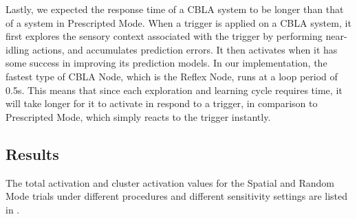 Lastly, we expected the response time of a CBLA system to be longer than that of a system in Prescripted Mode. When a trigger is applied on a CBLA system, it first explores the sensory context associated with the trigger by performing near-idling actions, and accumulates prediction errors. It then activates when it has some success in improving its prediction models. In our implementation, the fastest type of CBLA Node, which is the Reflex Node, runs at a loop period of 0.5s. This means that since each exploration and learning cycle requires time, it will take longer for it to activate in respond to a trigger, in comparison to Prescripted Mode, which simply reacts to the trigger instantly.


\subsection{Results}

The total activation and cluster activation values for the Spatial and Random Mode trials under different procedures and different sensitivity settings are listed in . 

